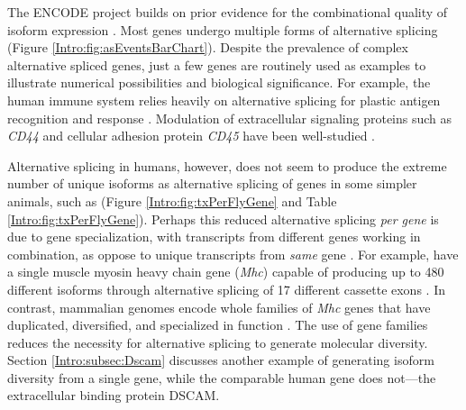     The ENCODE project builds on prior evidence for the combinational quality of isoform expression \citep{Wang2008,Pan2008}. Most genes undergo multiple forms of alternative splicing (Figure \ref{Intro:fig:asEventsBarChart}). Despite the prevalence of complex alternative spliced genes, just a few genes are routinely used as examples to illustrate numerical possibilities and biological significance. For example, the human immune system relies heavily on alternative splicing for plastic antigen recognition and response \citep{Lynch2004}. Modulation of extracellular signaling proteins such as \textit{CD44} and cellular adhesion protein \textit{CD45} have been well-studied \citep{Zikherman2008,Ponta2003}.

    Alternative splicing in humans, however, does not seem to produce the extreme number of unique isoforms as alternative splicing of genes in some simpler animals, such as \flies{} (Figure \ref{Intro:fig:txPerFlyGene} and Table \ref{Intro:fig:txPerFlyGene}). Perhaps this reduced alternative splicing \textit{per gene} is due to gene specialization, with transcripts from different genes working in combination, as oppose to unique transcripts from \textit{same} gene \citep{Park2007}. For example, \flies{} have a single muscle myosin heavy chain gene (\textit{Mhc}) capable of producing up to 480 different isoforms through alternative splicing of 17 different cassette exons \citep{Bernstein1983a}. In contrast, mammalian genomes encode whole families of \textit{Mhc} genes that have duplicated, diversified, and specialized in function \citep{Weiss1996}. The use of gene families reduces the necessity for alternative splicing to generate molecular diversity. Section \ref{Intro:subsec:Dscam} discusses another example of \flies{} generating isoform diversity from a single gene, while the comparable human gene does not---the extracellular binding protein DSCAM.

